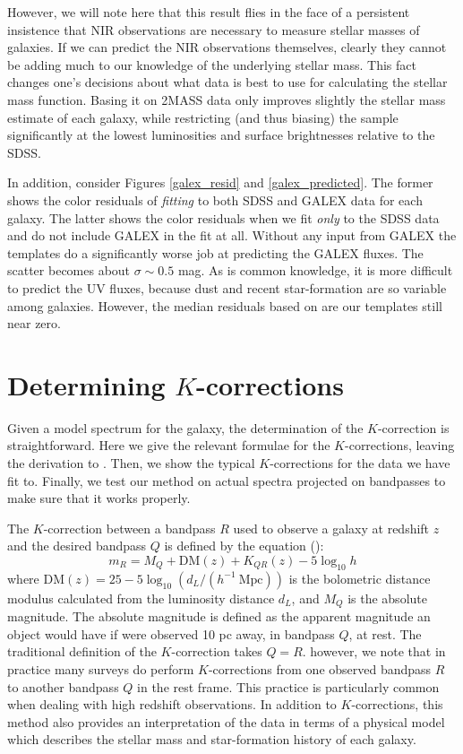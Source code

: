 \documentclass[10pt,preprint]{aastex}
\begin{document}
However, we will note here that this result flies in the face of a
persistent insistence that NIR observations are necessary to measure
stellar masses of galaxies. If we can predict the NIR observations
themselves, clearly they cannot be adding much to our knowledge of the
underlying stellar mass. This fact changes one's decisions about what
data is best to use for calculating the stellar mass function.  Basing
it on 2MASS data only improves slightly the stellar mass estimate of
each galaxy, while restricting (and thus biasing) the sample
significantly at the lowest luminosities and surface brightnesses
relative to the SDSS.

In addition, consider Figures \ref{galex_resid} and
\ref{galex_predicted}. The former shows the color residuals of {\it
fitting} to both SDSS and GALEX data for each galaxy. The latter shows
the color residuals when we fit {\it only} to the SDSS data and do not
include GALEX in the fit at all. Without any input from GALEX the
templates do a significantly worse job at predicting the GALEX
fluxes. The scatter becomes about $\sigma \sim 0.5$ mag.  As is common
knowledge, it is more difficult to predict the UV fluxes, because dust
and recent star-formation are so variable among galaxies. However, the
median residuals based on are our templates still near zero.

\section{Determining $K$-corrections}
\label{kcorrect}

Given a model spectrum for the galaxy, the determination of the
$K$-correction is straightforward. Here we give the relevant formulae
for the $K$-corrections, leaving the derivation to \citet{hogg02a}.
Then, we show the typical $K$-corrections for the data we have fit
to. Finally, we test our method on actual spectra projected on
bandpasses to make sure that it works properly.

The $K$-correction between a bandpass $R$ used to observe a galaxy at
redshift $z$ and the desired bandpass $Q$ is defined by the equation
(\citealt{oke68a, hogg02a}):
\begin{equation}
\label{kcorrecteqn}
m_R = M_Q + \mathrm{DM}(z) + K_{QR}(z) - 5 \log_{10} h 
\end{equation}
where $\mathrm{DM}(z) = 25 - 5\log_{10} (d_L /
(h^{-1}{\mathrm{~Mpc}}))$ is the bolometric distance modulus
calculated from the luminosity distance $d_L$, and $M_Q$ is the
absolute magnitude. The absolute magnitude is defined as the apparent
magnitude an object would have if were observed 10 pc away, in
bandpass $Q$, at rest.  The traditional definition of the
$K$-correction takes $Q=R$. however, we note that in practice many
surveys do perform $K$-corrections from one observed bandpass $R$ to
another bandpass $Q$ in the rest frame. This practice is particularly
common when dealing with high redshift observations.  In addition to
$K$-corrections, this method also provides an interpretation of the
data in terms of a physical model which describes the stellar mass and
star-formation history of each galaxy.
\end{document}
